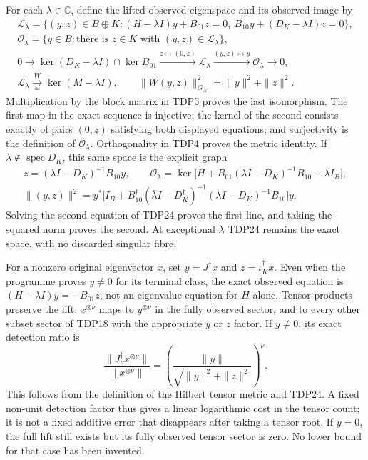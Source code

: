 \documentclass[11pt]{article}
\begin{document}
For each $\lambda\in\mathbb C$, define the lifted observed eigenspace
and its observed image by
\begin{equation}\tag{TDP24}
\begin{gathered}
\mathscr L_\lambda=
 \{(y,z)\in B\oplus K:
 (H-\lambda I)y+B_{01}z=0,
 \ B_{10}y+(D_K-\lambda I)z=0\},\\
\mathscr O_\lambda=\{y\in B:\text{there is }z\in K
 \text{ with }(y,z)\in\mathscr L_\lambda\},\\
0\longrightarrow\ker(D_K-\lambda I)\cap\ker B_{01}
 \xrightarrow{z\mapsto(0,z)}\mathscr L_\lambda
 \xrightarrow{(y,z)\mapsto y}\mathscr O_\lambda\longrightarrow0,\\
\mathscr L_\lambda\xrightarrow[\cong]{\ W\ }\ker(M-\lambda I),
\qquad\|W(y,z)\|_{G_N}^2=\|y\|^2+\|z\|^2.
\end{gathered}
\end{equation}
Multiplication by the block matrix in TDP5 proves the last isomorphism.
The first map in the exact sequence is injective; the kernel of the
second consists exactly of pairs $(0,z)$ satisfying both displayed
equations; and surjectivity is the definition of $\mathscr O_\lambda$.
Orthogonality in TDP4 proves the metric identity. If
$\lambda\notin\operatorname{spec}D_K$, this same space is the explicit
graph
\begin{equation}\tag{TDP25}
\begin{gathered}
z=(\lambda I-D_K)^{-1}B_{10}y,\qquad
\mathscr O_\lambda=
\ker\bigl[H+B_{01}(\lambda I-D_K)^{-1}B_{10}-\lambda I_B\bigr],\\
\|(y,z)\|^2=
y^*\bigl[I_B+B_{10}^\dagger(\bar\lambda I-D_K^\dagger)^{-1}
 (\lambda I-D_K)^{-1}B_{10}\bigr]y.
\end{gathered}
\end{equation}
Solving the second equation of TDP24 proves the first line, and taking
the squared norm proves the second. At exceptional $\lambda$ TDP24
remains the exact space, with no discarded singular fibre.

For a nonzero original eigenvector $x$, set $y=J^\dagger x$ and
$z=\iota_K^\dagger x$. Even when the programme proves $y\ne0$ for its
terminal class, the exact observed equation is
$(H-\lambda I)y=-B_{01}z$, not an eigenvalue equation for $H$ alone.
Tensor products preserve the lift: $x^{\otimes\nu}$ maps to
$y^{\otimes\nu}$ in the fully observed sector, and to every other
subset sector of TDP18 with the appropriate $y$ or $z$ factor.
If $y\ne0$, its exact detection ratio is
\begin{equation}\tag{TDP26}
\frac{\|J_\nu^\dagger x^{\otimes\nu}\|}{\|x^{\otimes\nu}\|}
 =\left(\frac{\|y\|}{\sqrt{\|y\|^2+\|z\|^2}}\right)^\nu.
\end{equation}
This follows from the definition of the Hilbert tensor metric and
TDP24. A fixed non-unit detection factor thus gives a linear logarithmic
cost in the tensor count; it is not a fixed additive error that disappears
after taking a tensor root. If $y=0$, the full lift still exists but its
fully observed tensor sector is zero. No lower bound for that case has
been invented.
\end{document}
